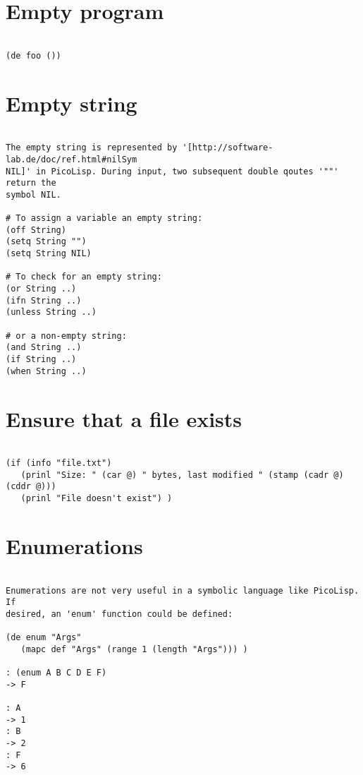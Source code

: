 \section*{Empty program}

\begin{verbatim}

(de foo ())

\end{verbatim}

\section*{Empty string}

\begin{verbatim}

The empty string is represented by '[http://software-lab.de/doc/ref.html#nilSym
NIL]' in PicoLisp. During input, two subsequent double qoutes '""' return the
symbol NIL.

# To assign a variable an empty string:
(off String)
(setq String "")
(setq String NIL)

# To check for an empty string:
(or String ..)
(ifn String ..)
(unless String ..)

# or a non-empty string:
(and String ..)
(if String ..)
(when String ..)

\end{verbatim}

\section*{Ensure that a file exists}

\begin{verbatim}

(if (info "file.txt")
   (prinl "Size: " (car @) " bytes, last modified " (stamp (cadr @) (cddr @)))
   (prinl "File doesn't exist") )

\end{verbatim}

\section*{Enumerations}

\begin{verbatim}

Enumerations are not very useful in a symbolic language like PicoLisp. If
desired, an 'enum' function could be defined:

(de enum "Args"
   (mapc def "Args" (range 1 (length "Args"))) )

: (enum A B C D E F)
-> F

: A
-> 1
: B
-> 2
: F
-> 6

\end{verbatim}

